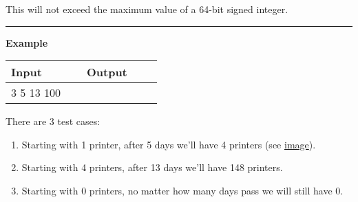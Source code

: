 This will not exceed the maximum value of a 64-bit signed integer.

\vspace{8pt}
\hrule

\textbf{Example}

\begin{table}[h]
    \centering
    \begin{tabular}{|p{0.4\linewidth}|p{0.4\linewidth}|}
        \hline
        Input & Output \\
        \hline
        3 \newline 1 5 \newline 4 13 \newline 0 100 & 
        \text{} \newline 4 \newline 148 \newline 0 \\
        \hline
    \end{tabular}
\end{table}

There are 3 test cases:

\begin{enumerate}
    \item Starting with 1 printer, after 5 days we'll have 4 printers (see \href{https://uwcs.co.uk/media/images/firefox_XuzeaIzMRs.original.png}{image}).
    \item Starting with 4 printers, after 13 days we'll have 148 printers.
    \item Starting with 0 printers, no matter how many days pass we will still have 0.
\end{enumerate}